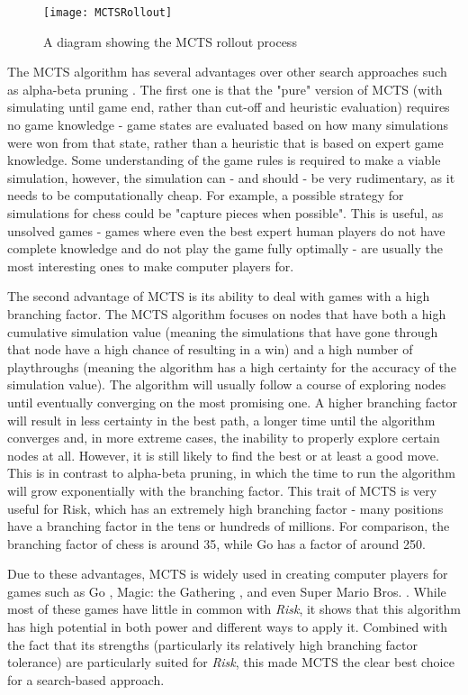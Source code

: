 \begin{figure}[H]
\texttt{[image: MCTSRollout]}
\caption{A diagram showing the MCTS rollout process}
\label{fig:MCTSRollout}
\end{figure}

The MCTS algorithm has several advantages over other search approaches such as alpha-beta pruning \cite{knuth1975analysis}. The first one is that the "pure" version of MCTS (with simulating until game end, rather than cut-off and heuristic evaluation) requires no game knowledge - game states are evaluated based on how many simulations were won from that state, rather than a heuristic that is based on expert game knowledge. Some understanding of the game rules is required to make a viable simulation, however, the simulation can - and should - be very rudimentary, as it needs to be computationally cheap. For example, a possible strategy for simulations for chess could be "capture pieces when possible". This is useful, as unsolved games - games where even the best expert human players do not have complete knowledge and do not play the game fully optimally - are usually the most interesting ones to make computer players for.

The second advantage of MCTS is its ability to deal with games with a high branching factor. The MCTS algorithm focuses on nodes that have both a high cumulative simulation value (meaning the simulations that have gone through that node have a high chance of resulting in a win) and a high number of playthroughs (meaning the algorithm has a high certainty for the accuracy of the simulation value). The algorithm will usually follow a course of exploring nodes until eventually converging on the most promising one. A higher branching factor will result in less certainty in the best path, a longer time until the algorithm converges and, in more extreme cases, the inability to properly explore certain nodes at all. However, it is still likely to find the best or at least a good move. This is in contrast to alpha-beta pruning, in which the time to run the algorithm will grow exponentially with the branching factor. This trait of MCTS is very useful for Risk, which has an extremely high branching factor \cite{bauer2023artificial} - many positions have a branching factor in the tens or hundreds of millions. For comparison, the branching factor of chess is around 35, while Go has a factor of around 250.

Due to these advantages, MCTS is widely used in creating computer players \cite{swiechowski2023monte} for games such as Go \cite{silver2016mastering,coulom2007computing}, Magic: the Gathering \cite{cowling2012ensemble}, and even Super Mario Bros. \cite{jacobsen2014monte}. While most of these games have little in common with \textit{Risk}, it shows that this algorithm has high potential in both power and different ways to apply it. Combined with the fact that its strengths (particularly its relatively high branching factor tolerance) are particularly suited for \textit{Risk}, this made MCTS the clear best choice for a search-based approach.

